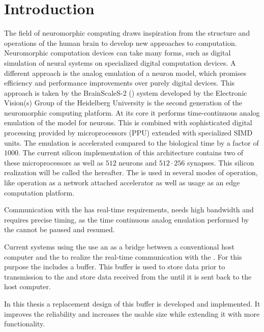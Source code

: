 \section{Introduction}
The field of neuromorphic computing draws inspiration from the structure and operations of the human brain to develop new approaches to computation. Neuromorphic computation devices can take many forms, such as digital simulation of neural systems on specialized digital computation devices\autocite{ref:spinnaker}. A different approach is the analog emulation of a neuron model, which promises efficiency and performance improvements over purely digital devices. This approach is taken by the BrainScaleS-2 (\BSSTwo{}) system\autocite{ref:bss2hw} developed by the Electronic Vision(s) Group of the Heidelberg University is the second generation of the \BSS{} neuromorphic computing platform. At its core it performs time-continuous analog emulation of the \AdEx{}\autocite{ref:adex} model for neurons. This is combined with sophisticated digital processing provided by microprocessors (PPU) extended with specialized SIMD units. The emulation is accelerated compared to the biological time by a factor of $\num{1000}$. The current silicon implementation of this architecture contains two of these microprocessors as well as $\num{512}$ neurons and $\num{512} · \num{256}$ synapses. This silicon realization will be called the \HICANNX{} hereafter. The \HICANNX{} is used in several modes of operation, like operation as a network attached accelerator\autocite{ref:network_accelerator} as well as usage as an edge computation platform\autocite{ref:mobile_system}.

Communication with the \HICANNX{} has real-time requirements, needs high bandwidth and requires precise timing, as the time continuous analog emulation performed by the \ASIC{} cannot be paused and resumed.

Current systems using the \HICANNX{} use an \FPGA{} as a bridge between a conventional host computer and the \ASIC{} to realize the real-time communication with the \ASIC{}. For this purpose the \FPGA{} includes a buffer. This buffer is used to store data prior to transmission to the \ASIC{} and store data received from the \ASIC{} until it is sent back to the host computer.

In this thesis a replacement design of this buffer is developed and implemented. It improves the reliability and increases the usable size while extending it with more functionality.
